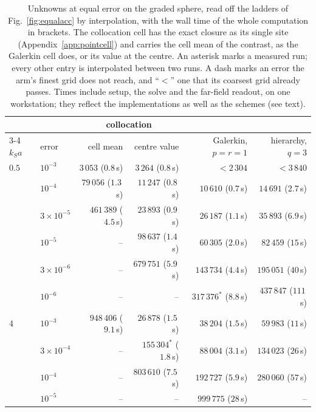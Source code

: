 \documentclass[11pt,a4paper]{article}
\begin{document}
\begin{table}[htbp]
\centering
\caption{Unknowns at equal error on the graded sphere, read off the ladders of Fig.~\ref{fig:equalacc}
by interpolation, with the wall time of the whole computation in brackets. The collocation cell has the
exact closure as its single site (Appendix~\ref{app:pointcell}) and carries the cell mean of the contrast,
as the Galerkin cell does, or its value at the centre. An asterisk marks a measured run; every other entry
is interpolated between two runs. A dash marks an error the arm's finest grid does not reach, and ``$<$''
one that its coarsest grid already passes. Times include setup, the solve and the far-field readout, on one
workstation; they reflect the implementations as well as the schemes (see text).}\label{tab:equalacc}
\small
\setlength{\tabcolsep}{4pt}
\begin{tabular}{@{}llrrrr@{}}
\toprule
 & & \multicolumn{2}{c}{collocation} & & \\
\cmidrule(lr){3-4}
$k_Sa$ & error & cell mean & centre value & Galerkin, $p=r=1$ & hierarchy, $q=3$ \\
\midrule
$0.5$ & $10^{-3}$          & $3\,053$ ($0.8$\,s)   & $3\,264$ ($0.8$\,s)   & $<2\,304$                 & $<3\,840$ \\
      & $10^{-4}$          & $79\,056$ ($1.3$\,s)  & $11\,247$ ($0.8$\,s)  & $10\,610$ ($0.7$\,s)      & $14\,691$ ($2.7$\,s) \\
      & $3\times10^{-5}$   & $461\,389$ ($4.5$\,s) & $23\,893$ ($0.9$\,s)  & $26\,187$ ($1.1$\,s)      & $35\,893$ ($6.9$\,s) \\
      & $10^{-5}$          & --                    & $98\,637$ ($1.4$\,s)  & $60\,305$ ($2.0$\,s)      & $82\,459$ ($15$\,s) \\
      & $3\times10^{-6}$   & --                    & $679\,751$ ($5.9$\,s) & $143\,734$ ($4.4$\,s)     & $195\,051$ ($40$\,s) \\
      & $10^{-6}$          & --                    & --                    & $317\,376^{*}$ ($8.8$\,s) & $437\,847$ ($111$\,s) \\
\addlinespace
$4$   & $10^{-3}$          & $948\,406$ ($9.1$\,s) & $26\,878$ ($1.5$\,s)  & $38\,204$ ($1.5$\,s)      & $59\,983$ ($11$\,s) \\
      & $3\times10^{-4}$   & --                    & $155\,304^{*}$ ($1.8$\,s) & $88\,004$ ($3.1$\,s)  & $134\,023$ ($26$\,s) \\
      & $10^{-4}$          & --                    & $803\,610$ ($7.5$\,s) & $192\,727$ ($5.9$\,s)     & $280\,060$ ($57$\,s) \\
      & $10^{-5}$          & --                    & --                    & $999\,775$ ($28$\,s)      & -- \\
\bottomrule
\end{tabular}
\end{table}
\end{document}
